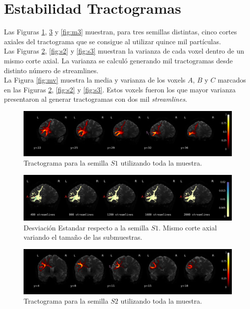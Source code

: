\section{Estabilidad Tractogramas}

Las Figuras \ref{fig:m1}, \ref{fig:m2} y \ref{fig:m3} muestran, para tres semillas
distintas, cinco cortes axiales del tractograma que se consigue al utilizar quince
mil part\'iculas.\\

Las Figuras \ref{fig:s1}, \ref{fig:s2} y \ref{fig:s3} muestran la varianza de 
cada voxel dentro de un mismo corte axial. La varianza se calcul\'o generando
mil tractogramas desde distinto n\'umero de streamlines. \\

La Figura \ref{fig:mv} muestra la media y varianza de los voxels $A$, $B$ y $C$
marcados en las Figuras \ref{fig:s1}, \ref{fig:s2} y \ref{fig:s3}. Estos voxels
fueron los que mayor varianza presentaron al generar tractogramas con dos mil
\textit{streamlines}.


\begin{figure}[h!]
   \centering
    \includegraphics[width=\textwidth]{img/m1.png}
    \caption{Tractograma para la semilla $S1$ utilizando toda la muestra.}
    \label{fig:m1}
\end{figure}

\begin{figure}[h!]
   \centering
    \includegraphics[width=\textwidth]{img/s1.png}
    \caption{Desviaci\'on Estandar respecto a la semilla $S1$. Mismo corte axial
             variando el tama\~no de las submuestras.}
    \label{fig:s1}
\end{figure}

\begin{figure}[h!]
   \centering
    \includegraphics[width=\textwidth]{img/m2.png}
    \caption{Tractograma para la semilla $S2$ utilizando toda la muestra.}
    \label{fig:m2}
\end{figure}

